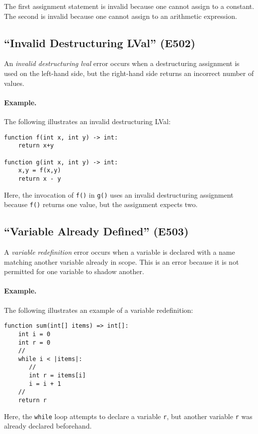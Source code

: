 The first assignment statement is invalid because one cannot assign to a constant.  The second is invalid because one cannot assign to an arithmetic expression.

\subsection{``Invalid Destructuring LVal'' (E502)}

An {\em invalid destructuring lval} error occurs when a destructuring assignment is used on the left-hand side, but the right-hand side returns an incorrect number of values.

\paragraph{Example.}  The following illustrates an invalid destructuring LVal:

\begin{lstlisting}
function f(int x, int y) -> int:
    return x+y

function g(int x, int y) -> int:
    x,y = f(x,y)
    return x - y
\end{lstlisting}

Here, the invocation of \lstinline{f()} in \lstinline{g()} uses an invalid destructuring assignment because \lstinline{f()} returns one value, but the assignment expects two.

\subsection{``Variable Already Defined'' (E503)}

A {\em variable redefinition} error occurs when a variable is declared with a name matching another variable already in scope.  This is an error because it is not permitted for one variable to shadow another.

\paragraph{Example.}  The following illustrates an example of a variable redefinition:

\begin{lstlisting}
function sum(int[] items) => int[]:
    int i = 0
    int r = 0
    //
    while i < |items|:
       //
       int r = items[i]
       i = i + 1
    //
    return r
\end{lstlisting}

Here, the \lstinline{while} loop attempts to declare a variable \lstinline{r}, but another variable \lstinline{r} was already declared beforehand.

